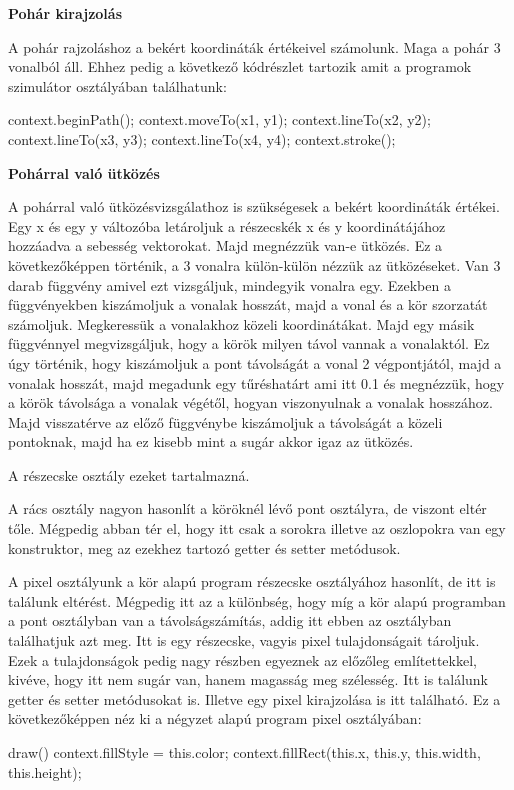 \textbf{Pohár kirajzolás}

A pohár rajzoláshoz a bekért koordináták értékeivel számolunk. Maga a pohár 3 vonalból áll. Ehhez pedig a következő kódrészlet tartozik amit a programok szimulátor osztályában találhatunk:
\begin{java}
context.beginPath();
context.moveTo(x1, y1);
context.lineTo(x2, y2);
context.lineTo(x3, y3);
context.lineTo(x4, y4);
context.stroke();
\end{java}


\textbf{Pohárral való ütközés}

A pohárral való ütközésvizsgálathoz is szükségesek a bekért koordináták értékei. Egy x és egy y változóba letároljuk a részecskék x és y koordinátájához hozzáadva a sebesség vektorokat. Majd megnézzük van-e ütközés. Ez a következőképpen történik, a 3 vonalra külön-külön nézzük az ütközéseket. Van 3 darab függvény amivel ezt vizsgáljuk, mindegyik vonalra egy. Ezekben a függvényekben kiszámoljuk a vonalak hosszát, majd a vonal és a kör szorzatát számoljuk. Megkeressük a vonalakhoz közeli koordinátákat. Majd egy másik függvénnyel megvizsgáljuk, hogy a körök milyen távol vannak a vonalaktól. Ez úgy történik, hogy kiszámoljuk a pont távolságát a vonal 2 végpontjától, majd a vonalak hosszát, majd megadunk egy tűréshatárt ami itt 0.1 és megnézzük, hogy a körök távolsága a vonalak végétől, hogyan viszonyulnak a vonalak hosszához. Majd visszatérve az előző függvénybe kiszámoljuk a távolságát a közeli pontoknak, majd ha ez kisebb mint a sugár akkor igaz az ütközés. 


A részecske osztály ezeket tartalmazná. 



A rács osztály nagyon hasonlít a köröknél lévő pont osztályra, de viszont eltér tőle. Mégpedig abban tér el, hogy itt csak a sorokra illetve az oszlopokra van egy konstruktor, meg az ezekhez tartozó getter és setter metódusok. 



A pixel osztályunk a kör alapú program részecske osztályához hasonlít, de itt is találunk eltérést. Mégpedig itt az a különbség, hogy míg a kör alapú programban a pont osztályban van a távolságszámítás, addig itt ebben az osztályban találhatjuk azt meg. Itt is egy részecske, vagyis pixel tulajdonságait tároljuk. Ezek a tulajdonságok pedig nagy részben egyeznek az előzőleg említettekkel, kivéve, hogy itt nem sugár van, hanem magasság meg szélesség. Itt is találunk getter és setter metódusokat is. Illetve egy pixel kirajzolása is itt található. Ez a következőképpen néz ki a négyzet alapú program pixel osztályában:
\begin{java}
  draw()
  {
    context.fillStyle = this.color;
    context.fillRect(this.x, this.y, this.width, this.height);	
  }
\end{java} 

